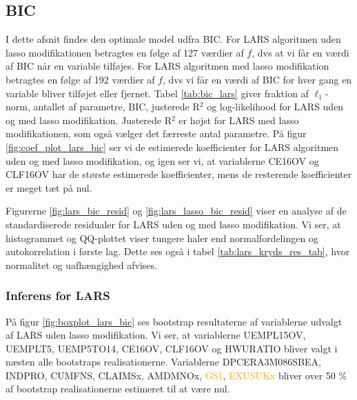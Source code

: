\subsection{BIC}
I dette afsnit findes den optimale model udfra BIC.
For LARS algoritmen uden lasso modifikationen betragtes en følge af 127 værdier af $f$, dvs at vi får en værdi af BIC når en variable tilføjes.
For LARS algoritmen med lasso modifikation betragtes en følge af 192 værdier af $f$, dvs vi får en værdi af BIC for hver gang en variable bliver tilføjet eller fjernet. 
Tabel \ref{tab:bic_lars} giver fraktion af \(\ell_1\)-norm, antallet af parametre, BIC, justerede R$^2$ og log-likelihood for LARS uden og med lasso modifikation. 
Justerede R$^2$ er højst for LARS med lasso modifikationen, som også vælger det færreste antal parametre. 
På figur \ref{fig:coef_plot_lars_bic} ser vi de estimerede koefficienter for LARS algoritmen uden og med lasso modifikation, og igen ser vi, at variablerne \textcolor{blue3}{CE16OV} og \textcolor{blue3}{CLF16OV} har de største estimerede koefficienter, mens de resterende koefficienter er meget tæt på nul. 




Figurerne \ref{fig:lars_bic_resid} og  \ref{fig:lars_lasso_bic_resid} viser en analyse af de standardiserede residualer for LARS uden og med lasso modifikation. 
Vi ser, at histogrammet og QQ-plottet viser tungere haler end normalfordelingen og autokorrelation i første lag. 
Dette ses også i tabel \ref{tab:lars_kryds_res_tab}, hvor normalitet og uafhængighed afvises.


\subsubsection{Inferens for LARS}
På figur \ref{fig:boxplot_lars_bic} ses bootstrap resultaterne af variablerne udvalgt af LARS uden lasso modifikation. 
Vi ser, at variablerne \textcolor{blue3}{UEMPL15OV}, \textcolor{blue3}{UEMPLT5}, \textcolor{blue3}{UEMP5TO14}, \textcolor{blue3}{CE16OV}, \textcolor{blue3}{CLF16OV} og \textcolor{blue3}{HWURATIO} bliver valgt i næsten alle bootstraps realisationerne.
Variablerne \textcolor{red3}{DPCERA3M086SBEA}, \textcolor{chartreuse4}{INDPRO}, \textcolor{chartreuse4}{CUMFNS}, \textcolor{blue3}{CLAIMSx}, \textcolor{red3}{AMDMNOx}, \textcolor{orange}{GS1}, \textcolor{orange}{EXUSUKx}  bliver over 50 \% af bootstrap realisationerne estimeret til at være nul.  

